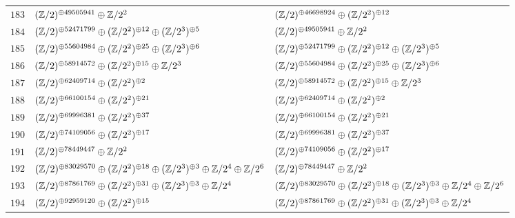 \begin{supertabular}{|c|p{5.5cm}|p{5.5cm}|}
$183$%
&$(\mathbb{Z}/2)^{\oplus49505941}\oplus\mathbb{Z}/2^{2}$%
&$(\mathbb{Z}/2)^{\oplus46698924}\oplus(\mathbb{Z}/2^{2})^{\oplus12}$\\

$184$%
&$(\mathbb{Z}/2)^{\oplus52471799}\oplus(\mathbb{Z}/2^{2})^{\oplus12}\oplus(\mathbb{Z}/2^{3})^{\oplus5}$%
&$(\mathbb{Z}/2)^{\oplus49505941}\oplus\mathbb{Z}/2^{2}$\\

$185$%
&$(\mathbb{Z}/2)^{\oplus55604984}\oplus(\mathbb{Z}/2^{2})^{\oplus25}\oplus(\mathbb{Z}/2^{3})^{\oplus6}$%
&$(\mathbb{Z}/2)^{\oplus52471799}\oplus(\mathbb{Z}/2^{2})^{\oplus12}\oplus(\mathbb{Z}/2^{3})^{\oplus5}$\\

$186$%
&$(\mathbb{Z}/2)^{\oplus58914572}\oplus(\mathbb{Z}/2^{2})^{\oplus15}\oplus\mathbb{Z}/2^{3}$%
&$(\mathbb{Z}/2)^{\oplus55604984}\oplus(\mathbb{Z}/2^{2})^{\oplus25}\oplus(\mathbb{Z}/2^{3})^{\oplus6}$\\

$187$%
&$(\mathbb{Z}/2)^{\oplus62409714}\oplus(\mathbb{Z}/2^{2})^{\oplus2}$%
&$(\mathbb{Z}/2)^{\oplus58914572}\oplus(\mathbb{Z}/2^{2})^{\oplus15}\oplus\mathbb{Z}/2^{3}$\\

$188$%
&$(\mathbb{Z}/2)^{\oplus66100154}\oplus(\mathbb{Z}/2^{2})^{\oplus21}$%
&$(\mathbb{Z}/2)^{\oplus62409714}\oplus(\mathbb{Z}/2^{2})^{\oplus2}$\\

$189$%
&$(\mathbb{Z}/2)^{\oplus69996381}\oplus(\mathbb{Z}/2^{2})^{\oplus37}$%
&$(\mathbb{Z}/2)^{\oplus66100154}\oplus(\mathbb{Z}/2^{2})^{\oplus21}$\\

$190$%
&$(\mathbb{Z}/2)^{\oplus74109056}\oplus(\mathbb{Z}/2^{2})^{\oplus17}$%
&$(\mathbb{Z}/2)^{\oplus69996381}\oplus(\mathbb{Z}/2^{2})^{\oplus37}$\\

$191$%
&$(\mathbb{Z}/2)^{\oplus78449447}\oplus\mathbb{Z}/2^{2}$%
&$(\mathbb{Z}/2)^{\oplus74109056}\oplus(\mathbb{Z}/2^{2})^{\oplus17}$\\

$192$%
&$(\mathbb{Z}/2)^{\oplus83029570}\oplus(\mathbb{Z}/2^{2})^{\oplus18}\oplus(\mathbb{Z}/2^{3})^{\oplus3}\oplus\mathbb{Z}/2^{4}\oplus\mathbb{Z}/2^{6}$%
&$(\mathbb{Z}/2)^{\oplus78449447}\oplus\mathbb{Z}/2^{2}$\\

$193$%
&$(\mathbb{Z}/2)^{\oplus87861769}\oplus(\mathbb{Z}/2^{2})^{\oplus31}\oplus(\mathbb{Z}/2^{3})^{\oplus3}\oplus\mathbb{Z}/2^{4}$%
&$(\mathbb{Z}/2)^{\oplus83029570}\oplus(\mathbb{Z}/2^{2})^{\oplus18}\oplus(\mathbb{Z}/2^{3})^{\oplus3}\oplus\mathbb{Z}/2^{4}\oplus\mathbb{Z}/2^{6}$\\

$194$%
&$(\mathbb{Z}/2)^{\oplus92959120}\oplus(\mathbb{Z}/2^{2})^{\oplus15}$%
&$(\mathbb{Z}/2)^{\oplus87861769}\oplus(\mathbb{Z}/2^{2})^{\oplus31}\oplus(\mathbb{Z}/2^{3})^{\oplus3}\oplus\mathbb{Z}/2^{4}$\\


\end{supertabular}
